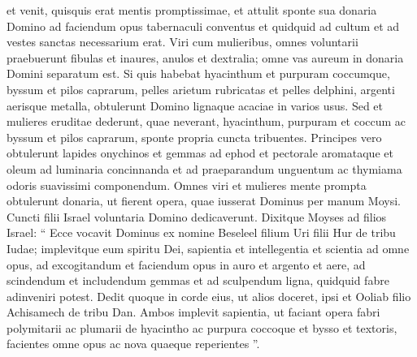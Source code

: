 \begin{biblechapter}
\begin{biblechapter}
\begin{biblechapter}
\begin{biblechapter}
\begin{biblechapter}
\begin{biblechapter}
\begin{biblechapter}
\begin{biblechapter}
\begin{biblechapter}
\begin{biblechapter}
\begin{biblechapter}
\begin{biblechapter}
\begin{biblechapter}
\begin{biblechapter}
\begin{biblechapter}
\begin{biblechapter}
\begin{biblechapter}
\begin{biblechapter}
\begin{biblechapter}
\begin{biblechapter}
\begin{biblechapter}
\begin{biblechapter}
\begin{biblechapter}
\begin{biblechapter}
\begin{biblechapter}
\begin{biblechapter}
\begin{biblechapter}
\begin{biblechapter}
\begin{biblechapter}
\begin{biblechapter}
\begin{biblechapter}
\begin{biblechapter}
\begin{biblechapter}
\begin{biblechapter}
\begin{biblechapter}
\verse et venit, quisquis erat mentis promptissimae, et attulit sponte sua donaria Domino ad faciendum opus tabernaculi conventus et quidquid ad cultum et ad vestes sanctas necessarium erat. 
\verse Viri cum mulieribus, omnes voluntarii praebuerunt fibulas et inaures, anulos et dextralia; omne vas aureum in donaria Domini separatum est. 
\verse Si quis habebat hyacinthum et purpuram coccumque, byssum et pilos caprarum, pelles arietum rubricatas et pelles delphini, 
\verse argenti aerisque metalla, obtulerunt Domino lignaque acaciae in varios usus.
 \verse Sed et mulieres eruditae dederunt, quae neverant, hyacinthum, purpuram et coccum ac byssum 
\verse et pilos caprarum, sponte propria cuncta tribuentes. 
 \verse Principes vero obtulerunt lapides onychinos et gemmas ad ephod et pectorale 
 \verse aromataque et oleum ad luminaria concinnanda et ad praeparandum unguentum ac thymiama odoris suavissimi componendum. 
\verse Omnes viri et mulieres mente prompta obtulerunt donaria, ut fierent opera, quae iusserat Dominus per manum Moysi. Cuncti filii Israel voluntaria Domino dedicaverunt.
 \verse Dixitque Moyses ad filios Israel: “ Ecce vocavit Dominus ex nomine Beseleel filium Uri filii Hur de tribu Iudae; 
\verse implevitque eum spiritu Dei, sapientia et intellegentia et scientia ad omne opus, 
\verse ad excogitandum et faciendum opus in auro et argento et aere, 
\verse ad scindendum et includendum gemmas et ad sculpendum ligna, quidquid fabre adinveniri potest. 
\verse Dedit quoque in corde eius, ut alios doceret, ipsi et Ooliab filio Achisamech de tribu Dan. 
\verse Ambos implevit sapientia, ut faciant opera fabri polymitarii ac plumarii de hyacintho ac purpura coccoque et bysso et textoris, facientes omne opus ac nova quaeque reperientes ”.
 

\end{biblechapter}
\end{biblechapter}
\end{biblechapter}
\end{biblechapter}
\end{biblechapter}
\end{biblechapter}
\end{biblechapter}
\end{biblechapter}
\end{biblechapter}
\end{biblechapter}
\end{biblechapter}
\end{biblechapter}
\end{biblechapter}
\end{biblechapter}
\end{biblechapter}
\end{biblechapter}
\end{biblechapter}
\end{biblechapter}
\end{biblechapter}
\end{biblechapter}
\end{biblechapter}
\end{biblechapter}
\end{biblechapter}
\end{biblechapter}
\end{biblechapter}
\end{biblechapter}
\end{biblechapter}
\end{biblechapter}
\end{biblechapter}
\end{biblechapter}
\end{biblechapter}
\end{biblechapter}
\end{biblechapter}
\end{biblechapter}
\end{biblechapter}
